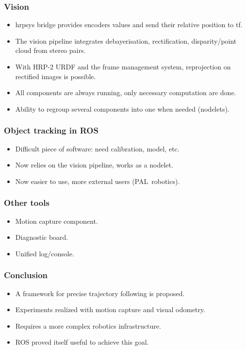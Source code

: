 \documentclass[14pt,utf8,hyperref={pdfpagelabels=false}]{beamer}
\begin{document}

\begin{slideDecision}
  \frametitle{Vision}

  \begin{itemize}
  \item hrpsys bridge provides encoders values and send their relative
    position to tf.
  \item The vision pipeline integrates debayerisation,
    rectification, disparity/point cloud from stereo pairs.
  \item With HRP-2 URDF and the frame management system, reprojection
    on rectified images is possible.
  \item All components are always running, only necessary computation
    are done.
  \item Ability to regroup several components into one when needed
    (nodelets).
  \end{itemize}
\end{slideDecision}


\begin{slideDecision}
  \frametitle{Object tracking in ROS}

  \begin{itemize}
  \item Difficult piece of software: need calibration, model, etc.
  \item Now relies on the vision pipeline, works as a nodelet.
  \item Now easier to use, more external users (PAL~robotics).
  \end{itemize}
\end{slideDecision}


\begin{slideDecision}
  \frametitle{Other tools}

  \begin{itemize}
  \item Motion capture component.
  \item Diagnostic board.
  \item Unified log/console.
  \end{itemize}
\end{slideDecision}

\begin{slideDecision}
  \frametitle{Conclusion}

  \begin{itemize}
  \item A framework for precise trajectory following is proposed.
  \item Experiments realized with motion capture and visual odometry.
  \item Requires a more complex robotics infrastructure.
  \item ROS proved itself useful to achieve this goal.
  \end{itemize}
\end{slideDecision}


\end{document}
